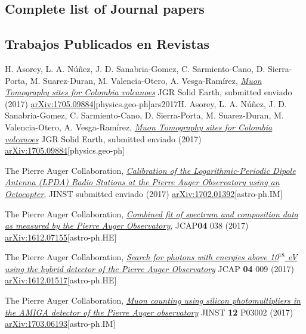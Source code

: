\ifeng
\subsection*{Complete list of Journal papers}
\else
\subsection*{Trabajos Publicados en Revistas}
\fi
\noindent
\begin{etaremune}

\item {}H. Asorey, L. A. Núñez, J. D. Sanabria-Gomez, C. Sarmiento-Cano, D. Sierra-Porta, M. Suarez-Duran, M. Valencia-Otero, A. Vesga-Ramírez, \href{}{\emph{Muon Tomography sites for Colombia volcanoes}} JGR Solid Earth, \ifeng submitted \else enviado \fi (2017) \href{http://arxiv.org/abs/1705.09884}{arXiv:1705.09884}[physics.geo-ph]ars{2017}H. Asorey, L. A. Núñez, J. D. Sanabria-Gomez, C. Sarmiento-Cano, D. Sierra-Porta, M. Suarez-Duran, M. Valencia-Otero, A. Vesga-Ramírez, \href{}{\emph{Muon Tomography sites for Colombia volcanoes}} JGR Solid Earth, \ifeng submitted \else enviado \fi (2017) \href{http://arxiv.org/abs/1705.09884}{arXiv:1705.09884}[physics.geo-ph]

\item {}The Pierre Auger Collaboration, \href{}{\emph{Calibration of the Logarithmic-Periodic Dipole Antenna (LPDA) Radio Stations at the Pierre Auger Observatory using an Octocopter}}, JINST \ifeng submitted \else enviado \fi (2017) \href{http://arxiv.org/abs/1702.01392}{arXiv:1702.01392}[astro-ph.IM]


\item {}The Pierre Auger Collaboration, \href{https://doi.org/10.1088/1475-7516/2017/04/038}{\emph{Combined fit of spectrum and composition data as measured by the Pierre Auger Observatory}}, JCAP{\bf{04}} 038 (2017) \href{http://arxiv.org/abs/1612.07155}{arXiv:1612.07155}[astro-ph.HE]

\item {}The Pierre Auger Collaboration, \href{https://doi.org/10.1088/1475-7516/2017/04/009}{\emph{Search for photons with energies above 10$^{18}$ eV using the hybrid detector of the Pierre Auger Observatory}} JCAP {\bf{04}} 009 (2017) \href{http://arxiv.org/abs/1612.01517}{arXiv:1612.01517}[astro-ph.HE]

\item {}The Pierre Auger Collaboration, \href{https://doi.org/10.1088/1748-0221/12/03/P03002}{\emph{Muon counting using silicon photomultipliers in the AMIGA detector of the Pierre Auger observatory}} JINST {\bf 12} P03002 (2017) \href{http://arxiv.org/abs/1703.06193}{arXiv:1703.06193}[astro-ph.IM]


\end{etaremune}
